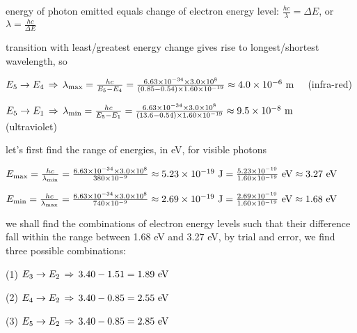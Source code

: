 \sol energy of photon emitted equals change of electron energy level: $\frac{hc}{\lambda} = \Delta E$, or $\lambda = \frac{hc}{\Delta E}$

transition with least/greatest energy change gives rise to longest/shortest wavelength, so

\eqskip $E_5 \to E_4 \, \Rightarrow \, \lambda_{\text{max}} = \frac{hc}{E_5-E_4} = \frac{6.63\times10^{-34}\times3.0\times10^8}{(0.85-0.54)\times1.60\times10^{-19}} \approx 4.0\times10^{-6} \text{ m} \quad$ (infra-red)
	
\eqyskip 
	
\eqskip $E_5 \to E_1 \, \Rightarrow \,  \lambda_{\text{min}} = \frac{hc}{E_5-E_1} = \frac{6.63\times10^{-34}\times3.0\times10^8}{(13.6-0.54)\times1.60\times10^{-19}} \approx 9.5\times10^{-8} \text{ m} \quad$ (ultraviolet) \eoe
	


\sol let's first find the range of energies, in eV, for visible photons

\eqskip $E_{\text{max}} = \frac{hc}{\lambda_{\text{min}}} = \frac{6.63\times10^{-34}\times 3.0 \times10^8}{380\times10^{-9}} \approx 5.23\times10^{-19} \text{ J} = \frac{5.23\times10^{-19}}{1.60\times10^{-19}} \text{ eV} \approx 3.27 \text{ eV}$

\eqyskip 

\eqskip $E_{\text{min}} = \frac{hc}{\lambda_{\text{max}}} = \frac{6.63\times10^{-34}\times 3.0 \times10^8}{740\times10^{-9}} \approx 2.69\times10^{-19} \text{ J} = \frac{2.69\times10^{-19}}{1.60\times10^{-19}} \text{ eV} \approx 1.68 \text{ eV}$

we shall find the combinations of electron energy levels such that their difference fall within the range between 1.68 eV and 3.27 eV, by trial and error, we find three possible combinations:

\begin{compactenum}
	\item[(1)] $E_3 \to E_2 \, \Rightarrow \, 3.40 - 1.51 = 1.89 \text{ eV}$
	
	\item[(2)] $E_4 \to E_2 \, \Rightarrow \, 3.40 - 0.85 = 2.55 \text{ eV}$
	
	\item[(3)] $E_5 \to E_2 \, \Rightarrow \, 3.40 - 0.85 = 2.85 \text{ eV}$
\end{compactenum}

